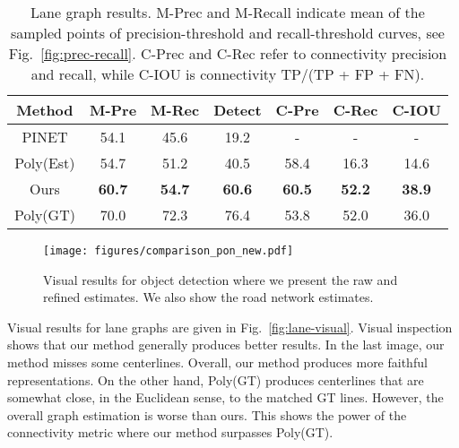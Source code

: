 \documentclass[10pt,twocolumn,letterpaper]{article}
\begin{document}
\begin{table}[ht]
\begin{center}
{
\tabcolsep=0.08cm
\begin{tabular}{ |c|c|c|c|c|c|c| }
\hline
Method & M-Pre & M-Rec & Detect & C-Pre & C-Rec & C-IOU  \\
\hline
PINET & 54.1 & 45.6 & 19.2 & - & -& -\\ 
Poly(Est) & 54.7 & 51.2 & 40.5 & 58.4 & 16.3 & 14.6\\
Ours& \textbf{60.7} & \textbf{54.7}& \textbf{60.6} & \textbf{60.5} & \textbf{52.2}&\textbf{38.9} \\
\hline
Poly(GT) & 70.0 & 72.3& 76.4 &53.8 & 52.0& 36.0\\
\hline
\end{tabular}
}
\end{center}
\caption{Lane graph results. M-Prec and M-Recall indicate mean of the sampled points of precision-threshold and recall-threshold curves, see Fig.~\ref{fig:prec-recall}. C-Prec and C-Rec refer to connectivity precision and recall, while C-IOU is connectivity TP/(TP + FP + FN).}
\label{tab:lane_compare}
\end{table}

\begin{figure*}
    \centering
    \texttt{[image: figures/comparison\_pon\_new.pdf]}
    \caption{Visual results for object detection where we present the raw and refined estimates. We also show the road network estimates.}
    \label{fig:visual-obj}
\end{figure*}

Visual results for lane graphs are given in Fig.~\ref{fig:lane-visual}. Visual inspection shows that our method generally produces better results. In the last image, our method misses some centerlines. Overall, our method produces more faithful representations. On the other hand, Poly(GT) produces centerlines that are somewhat close, in the Euclidean sense, to the matched GT lines. However, the overall graph estimation is worse than ours. This shows the power of the connectivity metric where our method surpasses Poly(GT). 
\end{document}
